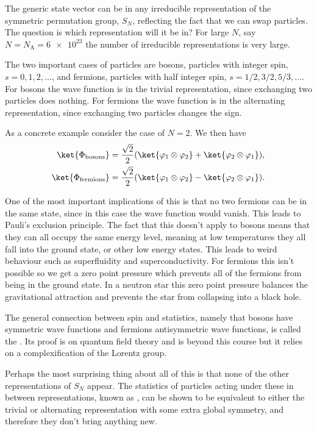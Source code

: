 The generic state vector can be in any irreducible representation of the symmetric permutation group, \(S_N\), reflecting the fact that we can swap particles.
The question is which representation will it be in?
For large \(N\), say \(N = N_{\mathrm{A}} = \num{6e23}\) the number of irreducible representations is very large.

The two important cases of particles are bosons, particles with integer spin, \(s = 0, 1, 2, \dotsc\), and fermions, particles with half integer spin, \(s = 1/2, 3/2, 5/3, \dotsc\).
For bosons the wave function is in the trivial representation, since exchanging two particles does nothing.
For fermions the wave function is in the alternating representation, since exchanging two particles changes the sign.

As a concrete example consider the case of \(N = 2\).
We then have
\begin{align}
    \ket{\Phi_{\mathrm{bosons}}} &= \frac{\sqrt{2}}{2} (\ket{\varphi_1 \directproduct \varphi_2} + \ket{\varphi_2 \directproduct \varphi_1}),\\
    \ket{\Phi_{\mathrm{fermions}}} &= \frac{\sqrt{2}}{2} (\ket{\varphi_1 \directproduct \varphi_2} - \ket{\varphi_2 \directproduct \varphi_1}).
\end{align}

One of the most important implications of this is that no two fermions can be in the same state, since in this case the wave function would vanish.
This leads to Pauli's exclusion principle.
The fact that this doesn't apply to bosons means that they can all occupy the same energy level, meaning at low temperatures they all fall into the ground state, or other low energy states.
This leads to weird behaviour such as superfluidity and superconductivity.
For fermions this isn't possible so we get a zero point pressure which prevents all of the fermions from being in the ground state.
In a neutron star this zero point pressure balances the gravitational attraction and prevents the star from collapsing into a black hole.

The general connection between spin and statistics, namely that bosons have symmetric wave functions and fermions antisymmetric wave functions, is called the .
Its proof is on quantum field theory and is beyond this course but it relies on a complexification of the Lorentz group.

Perhaps the most surprising thing about all of this is that none of the other representations of \(S_N\) appear.
The statistics of particles acting under these in between representations, known as , can be shown to be equivalent to either the trivial or alternating representation with some extra global symmetry, and therefore they don't bring anything new.